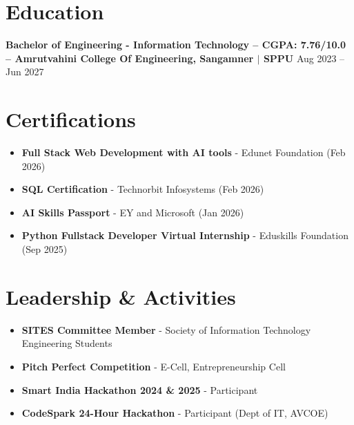 \documentclass[a4paper,10pt]{article}
\begin{document}
\section*{Education}

\textbf{Bachelor of Engineering - Information Technology -- {CGPA: 7.76/10.0 -- Amrutvahini College Of Engineering, Sangamner $|$ SPPU}}
\hfill Aug 2023 -- Jun 2027


\section*{Certifications}

\begin{itemize}[leftmargin=*]
\item \textbf{Full Stack Web Development with AI tools} - Edunet Foundation (Feb 2026)
\vspace{-5pt}
\item \textbf{SQL Certification} - Technorbit Infosystems (Feb 2026)
\vspace{-5pt}
\item \textbf{AI Skills Passport} - EY and Microsoft (Jan 2026)
\vspace{-5pt}
\item \textbf{Python Fullstack Developer Virtual Internship} - Eduskills Foundation (Sep 2025)
\end{itemize}


\section*{Leadership \& Activities}

\begin{itemize}[leftmargin=*]
\item \textbf{SITES Committee Member} - Society of Information Technology Engineering Students
\vspace{-5pt}
\item \textbf{Pitch Perfect Competition} - E-Cell, Entrepreneurship Cell
\vspace{-5pt}
\item \textbf{Smart India Hackathon 2024 \& 2025} - Participant
\vspace{-5pt}
\item \textbf{CodeSpark 24-Hour Hackathon} - Participant (Dept of IT, AVCOE)
\end{itemize}
\end{document}
